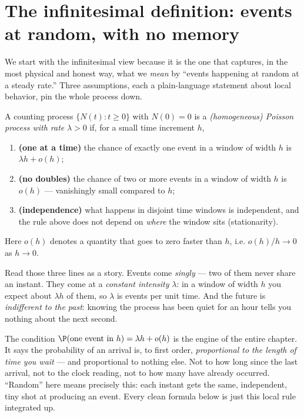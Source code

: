 \section{The infinitesimal definition: events at random, with no memory}
\label{ch25:infinitesimal}

We start with the infinitesimal view because it is the one that captures, in the
most physical and honest way, what we \emph{mean} by ``events happening at random
at a steady rate.'' Three assumptions, each a plain-language statement about
local behavior, pin the whole process down.

\begin{definition}
\label{ch25:def-infinitesimal}
A counting process $\{N(t): t \ge 0\}$ with $N(0)=0$ is a \emph{(homogeneous)
Poisson process with rate} $\lambda > 0$ if, for a small time increment $h$,
\begin{enumerate}
\item \textbf{(one at a time)} the chance of exactly one event in a window of
width $h$ is $\lambda h + o(h)$;
\item \textbf{(no doubles)} the chance of two or more events in a window of width
$h$ is $o(h)$ --- vanishingly small compared to $h$;
\item \textbf{(independence)} what happens in disjoint time windows is
independent, and the rule above does not depend on \emph{where} the window sits
(stationarity).
\end{enumerate}
Here $o(h)$ denotes a quantity that goes to zero faster than $h$, i.e.
$o(h)/h \to 0$ as $h \to 0$.
\end{definition}

Read those three lines as a story. Events come \emph{singly} --- two of them
never share an instant. They come at a \emph{constant intensity} $\lambda$: in a
window of width $h$ you expect about $\lambda h$ of them, so $\lambda$ is events
per unit time. And the future is \emph{indifferent to the past}: knowing the
process has been quiet for an hour tells you nothing about the next second.

\begin{happeningbox}
The condition $\P(\text{one event in }h) = \lambda h + o(h)$ is the engine of the
entire chapter. It says the probability of an arrival is, to first order,
\emph{proportional to the length of time you wait} --- and proportional to
nothing else. Not to how long since the last arrival, not to the clock reading,
not to how many have already occurred. ``Random'' here means precisely this:
each instant gets the same, independent, tiny shot at producing an event. Every
clean formula below is just this local rule integrated up.
\end{happeningbox}


